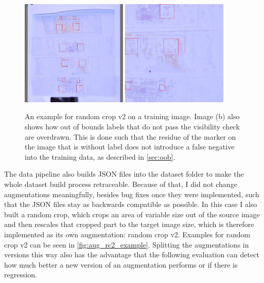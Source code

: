 \documentclass[10pt]{book}
\newcommand{\figureref}[1]{\autoref{#1}}
\begin{document}
\begin{figure}
  \centering
     {\includegraphics[width=0.45\textwidth]{image/aug_rc2_before}}
     {\includegraphics[width=0.45\textwidth]{image/aug_rc2_after}}
  \caption{An example for random crop v2 on a training image. Image (b) also shows how out of bounds labels that do not pass the visibility check are overdrawn. This is done such that the residue of the marker on the image that is without label does not introduce a false negative into the training data, as described in \autoref{sec:oob}.}
  \label{fig:aug_rc2_example}
\end{figure}

The data pipeline also builds \ac{JSON} files into the dataset folder to make the whole dataset build process retraceable. Because of that, I did not change augmentations meaningfully, besides bug fixes once they were implemented, such that the \ac{JSON} files stay as backwards compatible as possible. In this case I also built a random crop, which crops an area of variable size out of the source image and then rescales that cropped part to the target image size, which is therefore implemented as its own augmentation: random crop v2. Examples for random crop v2 can be seen in \figureref{fig:aug_rc2_example}. Splitting the augmentations in versions this way also has the advantage that the following evaluation can detect how much better a new version of an augmentation performs or if there is regression.
\end{document}
